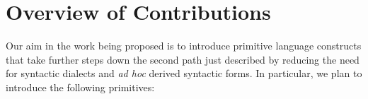 \section{Overview of Contributions}\label{sec:contributions}
Our aim in the work being proposed is to introduce primitive language constructs that take further steps down the second path just described by reducing the need for syntactic dialects and \emph{ad hoc} derived syntactic forms. In particular, we plan to introduce the following primitives:

